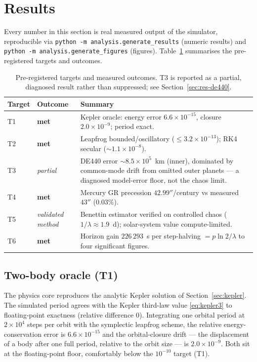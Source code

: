 \documentclass[11pt]{article}
\theoremstyle{definition}
\begin{document}
\section{Results}
\label{sec:results}

Every number in this section is real measured output of the simulator,
reproducible via \texttt{python -m analysis.generate\_results} (numeric
results) and \texttt{python -m analysis.generate\_figures} (figures).
Table~\ref{tab:summary} summarises the pre-registered targets and outcomes.

\begin{table}[h]
\centering
\begin{tabular}{llp{}}
\toprule
Target & Outcome & Summary \\
\midrule
T1 & \textbf{met} & Kepler oracle: energy error $6.6\times10^{-15}$, closure
$2.0\times10^{-9}$; period exact. \\
T2 & \textbf{met} & Leapfrog bounded/oscillatory ($\le 3.2\times10^{-13}$); RK4
secular ($\sim\!1.1\times10^{-8}$). \\
T3 & \emph{partial} & DE440 error $\sim\!8.5\times10^{5}$~km (inner), dominated
by common-mode drift from omitted outer planets --- a diagnosed model-error
floor, not the chaos limit. \\
T4 & \textbf{met} & Mercury GR precession $42.99''$/century vs measured $43''$
($0.03\%$). \\
T5 & \emph{validated method} & Benettin estimator verified on controlled chaos
($1/\lambda \approx 1.9$~d); solar-system value compute-limited. \\
T6 & \textbf{met} & Horizon gain $226\,293$~s per step-halving $=p\ln2/\lambda$
to four significant figures. \\
\bottomrule
\end{tabular}
\caption{Pre-registered targets and measured outcomes. T3 is reported as a
partial, diagnosed result rather than suppressed; see Section~\ref{sec:res-de440}.}
\label{tab:summary}
\end{table}

\subsection{Two-body oracle (T1)}
The physics core reproduces the analytic Kepler solution of
Section~\ref{sec:kepler}. The simulated period agrees with the Kepler
third-law value \eqref{eq:kepler3} to floating-point exactness (relative
difference $0$). Integrating one orbital period at $2\times10^4$ steps per
orbit with the symplectic leapfrog scheme, the relative energy-conservation
error is $6.6\times10^{-15}$ and the orbital-closure drift --- the
displacement of a body after one full period, relative to the orbit size ---
is $2.0\times10^{-9}$. Both sit at the floating-point floor, comfortably below
the $10^{-10}$ target (T1).
\end{document}
